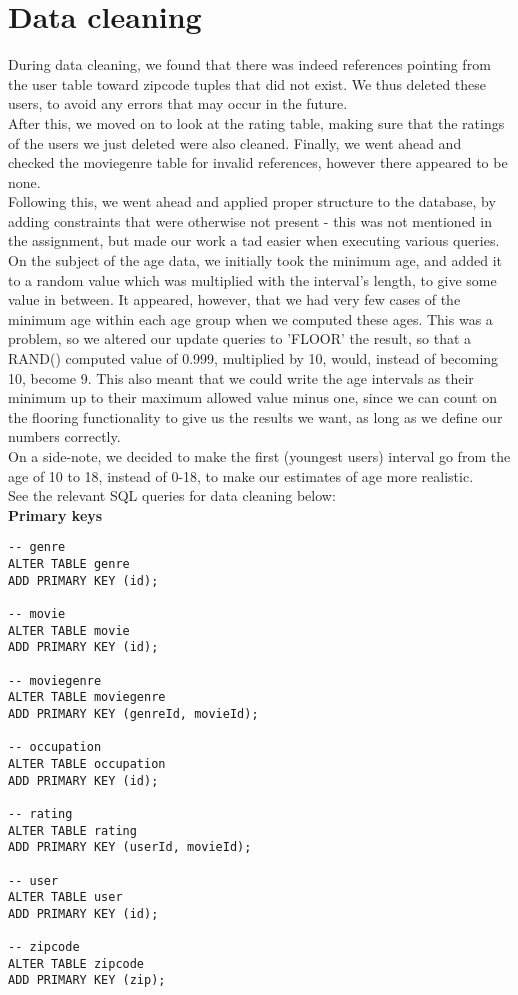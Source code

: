 \section*{Data cleaning}

\noindent During data cleaning, we found that there was indeed references pointing from the user table toward zipcode tuples that did not exist. We thus deleted these users, to avoid any errors that may occur in the future. \\
After this, we moved on to look at the rating table, making sure that the ratings of the users we just deleted were also cleaned. Finally, we went ahead and checked the moviegenre table for invalid references, however there appeared to be none. \\
\indent Following this, we went ahead and applied proper structure to the database, by adding constraints that were otherwise not present - this was not mentioned in the assignment, but made our work a tad easier when executing various queries. \\
On the subject of the age data, we initially took the minimum age, and added it to a random value which was multiplied with the interval's length, to give some value in between. It appeared, however, that we had very few cases of the minimum age within each age group when we computed these ages. This was a problem, so we altered our update queries to 'FLOOR' the result, so that a RAND() computed value of 0.999, multiplied by 10, would, instead of becoming 10, become 9. This also meant that we could write the age intervals as their minimum up to their maximum allowed value minus one, since we can count on the flooring functionality to give us the results we want, as long as we define our numbers correctly. \\
\indent On a side-note, we decided to make the first (youngest users) interval go from the age of 10 to 18, instead of 0-18, to make our estimates of age more realistic. \\

See the relevant SQL queries for data cleaning below: \\

\noindent\textbf{Primary keys} \\

\begin{lstlisting}
-- genre
ALTER TABLE genre
ADD PRIMARY KEY (id);

-- movie
ALTER TABLE movie
ADD PRIMARY KEY (id);

-- moviegenre
ALTER TABLE moviegenre
ADD PRIMARY KEY (genreId, movieId);

-- occupation
ALTER TABLE occupation
ADD PRIMARY KEY (id);

-- rating
ALTER TABLE rating
ADD PRIMARY KEY (userId, movieId);

-- user
ALTER TABLE user
ADD PRIMARY KEY (id);

-- zipcode
ALTER TABLE zipcode
ADD PRIMARY KEY (zip);
\end{lstlisting}
\bigskip

